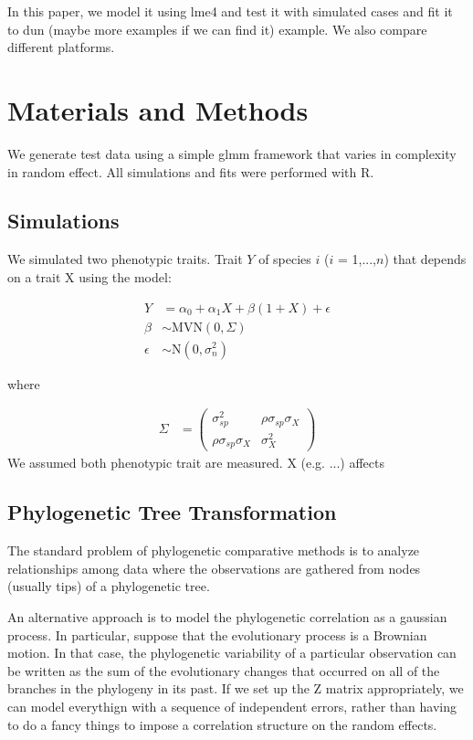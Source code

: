 \documentclass[12pt]{article}
\begin{document}
In this paper, we model it using lme4 and test it with simulated cases and fit it to dun (maybe more examples if we can find it) example. 
We also compare different platforms. 

\section{Materials and Methods}

We generate test data using a simple glmm framework that varies in complexity in random effect. All simulations and fits were performed with R. 

\subsection{Simulations}


We simulated two phenotypic traits. Trait $Y$ of species $i$ ($i$ = 1,...,$n$) that depends on a trait X using the model:

\begin{align}
Y & = \alpha_{0} + \alpha_{1}X + \beta (1+X) + \epsilon 
\\
\beta & \sim \mathrm{MVN}(0,\Sigma)
\\
\epsilon & \sim \mathrm{N}(0, \sigma^2_{n})
\end{align}

where

\begin{align}
\Sigma & = \begin{pmatrix} \sigma^2_{sp} & \rho \sigma_{sp} \sigma_{X} \\ \rho \sigma_{sp} \sigma_{X} & \sigma^2_{X} \end{pmatrix}
\end{align}
We assumed both phenotypic trait are measured. X (e.g. ...) affects 




\subsection{Phylogenetic Tree Transformation}
The standard problem of phylogenetic comparative methods is to analyze relationships among data where the observations are gathered from nodes (usually tips) of a phylogenetic tree. 

An alternative approach is to model the phylogenetic correlation as a gaussian process. 
In particular, suppose that the evolutionary process is a Brownian motion. 
In that case, the phylogenetic variability of a particular observation can be written as the sum of the evolutionary changes that occurred on all of the branches in the phylogeny in its past. 
If we set up the Z matrix appropriately, we can model everythign with a sequence of independent errors, rather than having to do a fancy things to impose a correlation structure on the random effects. 
\end{document}
